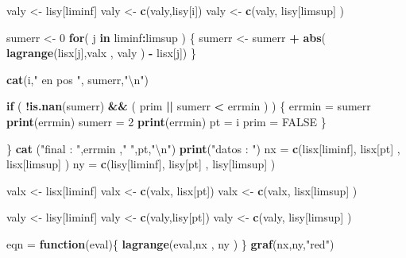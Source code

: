 \documentclass[]{article}
\newenvironment{Shaded}{\begin{snugshade}}{\end{snugshade}}
\newcommand{\KeywordTok}[1]{\textcolor[rgb]{0.13,0.29,0.53}{\textbf{#1}}}
\newcommand{\DecValTok}[1]{\textcolor[rgb]{0.00,0.00,0.81}{#1}}
\newcommand{\CharTok}[1]{\textcolor[rgb]{0.31,0.60,0.02}{#1}}
\newcommand{\StringTok}[1]{\textcolor[rgb]{0.31,0.60,0.02}{#1}}
\newcommand{\OtherTok}[1]{\textcolor[rgb]{0.56,0.35,0.01}{#1}}
\newcommand{\ControlFlowTok}[1]{\textcolor[rgb]{0.13,0.29,0.53}{\textbf{#1}}}
\newcommand{\OperatorTok}[1]{\textcolor[rgb]{0.81,0.36,0.00}{\textbf{#1}}}
\newcommand{\NormalTok}[1]{#1}
\begin{document}
\begin{Shaded}
\begin{Highlighting}[]
\NormalTok{    valy <-}\StringTok{ }\NormalTok{lisy[liminf]}
\NormalTok{    valy <-}\StringTok{ }\KeywordTok{c}\NormalTok{(valy,lisy[i])}
\NormalTok{    valy <-}\StringTok{ }\KeywordTok{c}\NormalTok{(valy, lisy[limsup] )}
    
\NormalTok{    sumerr <-}\StringTok{ }\DecValTok{0}    
    \ControlFlowTok{for}\NormalTok{( j }\ControlFlowTok{in}\NormalTok{ liminf}\OperatorTok{:}\NormalTok{limsup )}
\NormalTok{    \{}
\NormalTok{      sumerr <-}\StringTok{ }\NormalTok{sumerr }\OperatorTok{+}\StringTok{ }\KeywordTok{abs}\NormalTok{( }\KeywordTok{lagrange}\NormalTok{(lisx[j],valx , valy ) }\OperatorTok{-}\StringTok{ }\NormalTok{lisx[j])}
\NormalTok{    \}}
    
    \KeywordTok{cat}\NormalTok{(i,}\StringTok{" en pos "}\NormalTok{, sumerr,}\StringTok{"}\CharTok{\textbackslash{}n}\StringTok{"}\NormalTok{)}
    
    \ControlFlowTok{if}\NormalTok{ ( }\OperatorTok{!}\KeywordTok{is.nan}\NormalTok{(sumerr) }\OperatorTok{&&}\StringTok{ }\NormalTok{( prim }\OperatorTok{||}\StringTok{ }\NormalTok{sumerr }\OperatorTok{<}\StringTok{ }\NormalTok{errmin ) )}
\NormalTok{    \{}
\NormalTok{      errmin =}\StringTok{ }\NormalTok{sumerr}
      \KeywordTok{print}\NormalTok{(errmin)}
\NormalTok{      sumerr =}\StringTok{ }\DecValTok{2}
      \KeywordTok{print}\NormalTok{(errmin)}
\NormalTok{      pt =}\StringTok{ }\NormalTok{i }
\NormalTok{      prim =}\StringTok{ }\OtherTok{FALSE}
\NormalTok{    \}}
    
    
\NormalTok{  \}}
  \KeywordTok{cat}\NormalTok{ (}\StringTok{"final : "}\NormalTok{,errmin ,}\StringTok{"    "}\NormalTok{,pt,}\StringTok{"}\CharTok{\textbackslash{}n}\StringTok{"}\NormalTok{)}
  \KeywordTok{print}\NormalTok{(}\StringTok{"datos : "}\NormalTok{)}
\NormalTok{  nx =}\StringTok{ }\KeywordTok{c}\NormalTok{(lisx[liminf], lisx[pt] , lisx[limsup]  )}
\NormalTok{  ny =}\StringTok{ }\KeywordTok{c}\NormalTok{(lisy[liminf], lisy[pt] , lisy[limsup]  )}
  
\NormalTok{  valx <-}\StringTok{ }\NormalTok{lisx[liminf]}
\NormalTok{  valx <-}\StringTok{ }\KeywordTok{c}\NormalTok{(valx, lisx[pt])}
\NormalTok{  valx <-}\StringTok{ }\KeywordTok{c}\NormalTok{(valx, lisx[limsup] )}
  
\NormalTok{  valy <-}\StringTok{ }\NormalTok{lisy[liminf]}
\NormalTok{  valy <-}\StringTok{ }\KeywordTok{c}\NormalTok{(valy,lisy[pt])}
\NormalTok{  valy <-}\StringTok{ }\KeywordTok{c}\NormalTok{(valy, lisy[limsup] )}

\NormalTok{  eqn =}\StringTok{ }\ControlFlowTok{function}\NormalTok{(eval)\{ }\KeywordTok{lagrange}\NormalTok{(eval,nx , ny ) \}}
  \KeywordTok{graf}\NormalTok{(nx,ny,}\StringTok{"red"}\NormalTok{)}
  

\end{Highlighting}
\end{Shaded}
\end{document}
